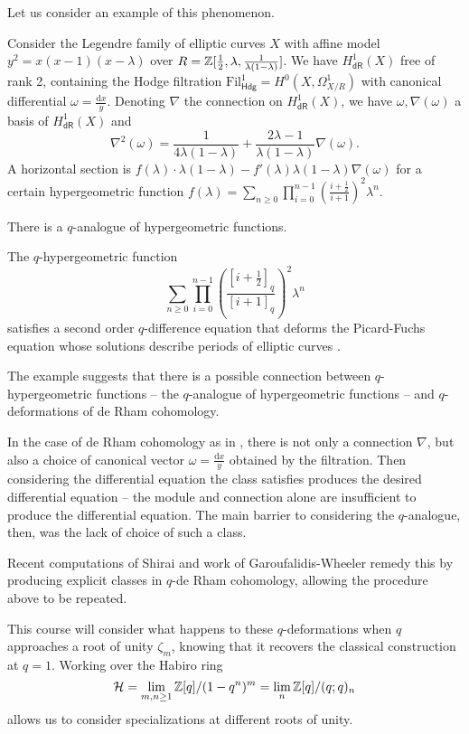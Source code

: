 Let us consider an example of this phenomenon. 
\begin{example}\label{ex: legendre family}
    Consider the Legendre family of elliptic curves $X$ with affine model $y^{2}=x(x-1)(x-\lambda)$ over $R=\mathbb{Z}[\frac{1}{2},\lambda,\frac{1}{\lambda(1-\lambda)}]$. We have $H^{1}_{\mathsf{dR}}(X)$ free of rank 2, containing the Hodge filtration $\mathrm{Fil}^{1}_{\mathsf{Hdg}}=H^{0}(X,\Omega^{1}_{X/R})$ with canonical differential $\omega=\frac{\mathrm{d}x}{y}$. Denoting $\nabla$ the connection on $H^{1}_{\mathsf{dR}}(X)$, we have $\omega,\nabla(\omega)$ a basis of $H^{1}_{\mathsf{dR}}(X)$ and 
    $$\nabla^{2}(\omega)=\frac{1}{4\lambda(1-\lambda)}+\frac{2\lambda-1}{\lambda(1-\lambda)}\nabla(\omega).$$
    A horizontal section is $f(\lambda)\cdot\lambda(1-\lambda)-f'(\lambda)\lambda(1-\lambda)\nabla(\omega)$
    for a certain hypergeometric function $f(\lambda)=\sum_{n\geq0}\prod_{i=0}^{n-1}\left(\frac{i+\frac{1}{2}}{i+1}\right)^{2}\lambda^{n}$. 
\end{example}
There is a $q$-analogue of hypergeometric functions. 
\begin{example}\label{ex: q deformation of Picard-Fuchs}
    The $q$-hypergeometric function 
    $$\sum_{n\geq0}\prod_{i=0}^{n-1}\left(\frac{[i+\frac{1}{2}]_{q}}{[i+1]_{q}}\right)^{2}\lambda^{n}$$
    satisfies a second order $q$-difference equation that deforms the Picard-Fuchs equation whose solutions describe periods of elliptic curves \cite{PicardFuchs}.
\end{example}
The example suggests that there is a possible connection between $q$-hypergeometric functions -- the $q$-analogue of hypergeometric functions -- and $q$-deformations of de Rham cohomology. 

In the case of de Rham cohomology as in , there is not only a connection $\nabla$, but also a choice of canonical vector $\omega=\frac{\mathrm{d}x}{y}$ obtained by the filtration. Then considering the differential equation the class satisfies produces the desired differential equation -- the module and connection alone are insufficient to produce the differential equation. The main barrier to considering the $q$-analogue, then, was the lack of choice of such a class. 

Recent computations of Shirai \cite{Shirai} and work of Garoufalidis-Wheeler remedy this by producing explicit classes in $q$-de Rham cohomology, allowing the procedure above to be repeated. 

This course will consider what happens to these $q$-deformations when $q$ approaches a root of unity $\zeta_{m}$, knowing that it recovers the classical construction at $q=1$. Working over the Habiro ring 
$$\mathcal{H}=\lim_{m,n\geq1}\mathbb{Z}[q]/(1-q^{n})^{m}=\lim_{n}\mathbb{Z}[q]/(q;q)_{n}$$
allows us to consider specializations at different roots of unity. 


